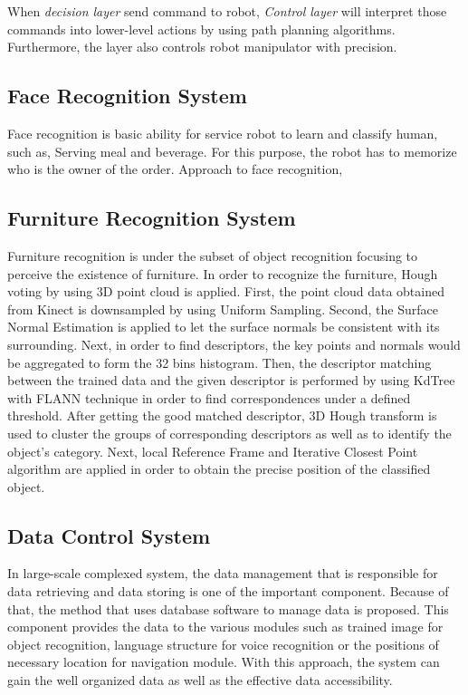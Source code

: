 \documentclass{llncs}
\begin{document}
When \textit{decision layer} send command to robot, \textit{Control layer} will interpret those commands into lower-level actions by using path planning algorithms. Furthermore, the layer also controls robot manipulator with precision.

\subsection{Face Recognition System}

Face recognition is basic ability for service robot to learn and classify human, such as, Serving meal and beverage. For this purpose, the robot has to memorize who is the owner of the order. Approach to face recognition, 

\subsection{Furniture Recognition System}

Furniture recognition is under the subset of object recognition focusing to perceive the existence of furniture. In order to recognize the furniture, Hough voting by using 3D point cloud is applied. First, the point cloud data obtained from Kinect is downsampled by using Uniform Sampling. Second, the Surface Normal Estimation is applied to let the surface normals be consistent with its surrounding. Next, in order to find descriptors, the key points and normals would be aggregated to form the 32 bins histogram. Then, the descriptor matching between the trained data and the given descriptor is performed by using KdTree with FLANN technique in order to find correspondences under a defined threshold. After getting the good matched descriptor, 3D Hough transform is used to cluster the groups of corresponding descriptors as well as to identify the object's category. Next, local Reference Frame and Iterative Closest Point algorithm are applied in order to obtain the precise position of the classified object.

\subsection{Data Control System}
In large-scale complexed system, the data management that is responsible for data retrieving and data storing  is one of the important component. Because of that, the method that uses database software to manage data is proposed. This component provides the data to the various modules such as trained image for object recognition, language structure for voice recognition or the positions of necessary location for navigation module. With this approach, the system can gain the well organized data as well as the effective data accessibility.
\end{document}
